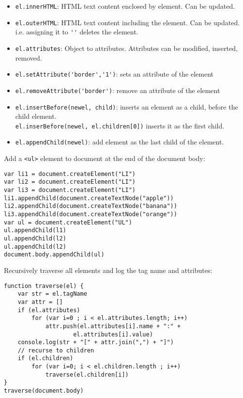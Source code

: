 \documentclass[trans,compress,xcolor=table]{beamer}
\begin{document}
\begin{frame}[fragile]
\begin{itemize}
\item \lstinline!el.innerHTML!: HTML text content enclosed
	by element. Can be updated.
\item \lstinline!el.outerHTML!: HTML text content including
	the element. Can be updated. i.e. assigning it to \lstinline!''!
	deletes the element.
\item \lstinline!el.attributes!: Object to attributes. Attributes
	can be modified, inserted, removed.
\item \lstinline!el.setAttribute('border','1')!:
	sets an attribute of the element \\
\item \lstinline!el.removeAttribute('border')!:
	remove an attribute of the element \\
\item \lstinline!el.insertBefore(newel, child)!: 
	inserts an element as a child, before the child element.\\
	\lstinline!el.inserBefore(newel, el.children[0])! inserts
	it as the first child.
\item \lstinline!el.appendChild(newel)!:
	add element as the last child of the element.
\end{itemize}
\end{frame}

\begin{frame}[fragile]
Add a \lstinline!<ul>! element to document at the end of
the document body:
\begin{lstlisting}
var li1 = document.createElement("LI")
var li2 = document.createElement("LI")
var li3 = document.createElement("LI")
li1.appendChild(document.createTextNode("apple"))
li2.appendChild(document.createTextNode("banana"))
li3.appendChild(document.createTextNode("orange"))
var ul = document.createElement("UL")
ul.appendChild(l1)
ul.appendChild(l2)
ul.appendChild(l2)
document.body.appendChild(ul)
\end{lstlisting}
\end{frame}

\begin{frame}[fragile]
Recursively traverse all elements and log the tag name and
attributes:
\begin{lstlisting}
function traverse(el) {
    var str = el.tagName
    var attr = []
    if (el.attributes)
        for (var i=0 ; i < el.attributes.length; i++)
            attr.push(el.attributes[i].name + ":" + 
                    el.attributes[i].value)
    console.log(str + "[" + attr.join(",") + "]")
    // recurse to children
    if (el.children)
        for (var i=0; i < el.children.length ; i++)
            traverse(el.children[i])
}
traverse(document.body)
\end{lstlisting}
\end{frame}
\end{document}
